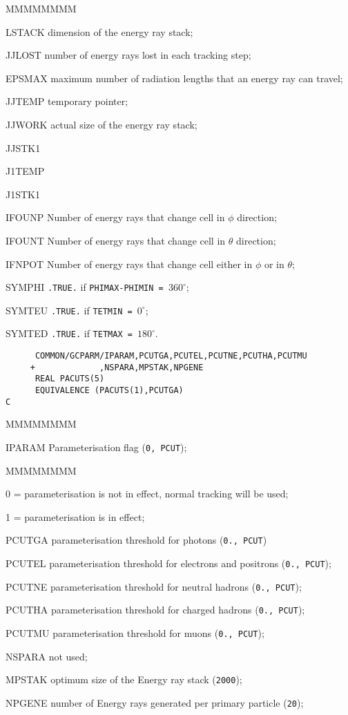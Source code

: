\begin{DLtt}{MMMMMMMM}
\item[LSTACK] dimension of the energy ray stack;
\item[JJLOST] number of energy rays lost in each tracking step;
\item[EPSMAX] maximum number of radiation lengths that an energy ray 
can travel;
\item[JJTEMP] temporary pointer;
\item[JJWORK] actual size of the energy ray stack;
\item[JJSTK1]
\item[J1TEMP]
\item[J1STK1]
\item[IFOUNP] Number of energy rays that change cell in $\phi$
direction;
\item[IFOUNT] Number of energy rays that change cell in $\theta$
direction;
\item[IFNPOT] Number of energy rays that change cell either in $\phi$
or in $\theta$;
\item[SYMPHI] {\tt .TRUE.} if {\tt PHIMAX-PHIMIN = }$360^{\circ}$;
\item[SYMTEU] {\tt .TRUE.} if {\tt TETMIN = }$0^{\circ}$;
\item[SYMTED] {\tt .TRUE.} if {\tt TETMAX = }$180^{\circ}$.
\end{DLtt}
\begin{verbatim}
      COMMON/GCPARM/IPARAM,PCUTGA,PCUTEL,PCUTNE,PCUTHA,PCUTMU
     +             ,NSPARA,MPSTAK,NPGENE
      REAL PACUTS(5)
      EQUIVALENCE (PACUTS(1),PCUTGA)
C
\end{verbatim}
\begin{DLtt}{MMMMMMMM}
\item[IPARAM]Parameterisation flag ({\tt 0, PCUT});
\begin{DLtt}{MMMMMMMM}
\item[0 =]parameterisation is not in effect, normal tracking will be used;
\item[1 =]parameterisation is in effect;
\end{DLtt}
\item[PCUTGA]parameterisation threshold for photons ({\tt 0.,  PCUT})
\item[PCUTEL]parameterisation threshold for electrons and positrons
({\tt 0.,  PCUT});
\item[PCUTNE]parameterisation threshold for neutral hadrons
({\tt 0., PCUT});
\item[PCUTHA]parameterisation threshold for charged hadrons
({\tt 0., PCUT});
\item[PCUTMU]parameterisation threshold for muons
({\tt 0.,  PCUT});
\item[NSPARA] not used;
\item[MPSTAK] optimum size of the Energy ray stack ({\tt 2000});
\item[NPGENE] number of Energy rays generated per primary particle
({\tt 20});
\end{DLtt}

